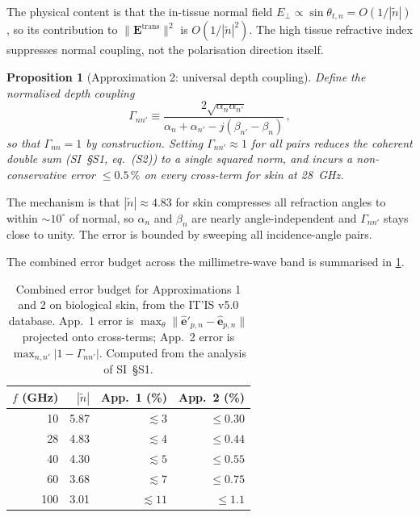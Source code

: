 \documentclass[journal,twocolumn,10pt]{IEEEtran}
\theoremstyle{plain}
\newtheorem{proposition}[theorem]{Proposition}
\theoremstyle{definition}
\theoremstyle{remark}
\newcommand{\EE}{\mathbf{E}}
\newcommand{\ntilde}{\tilde{n}}
\begin{document}
The physical content is that the in-tissue normal field
$E_\perp \propto \sin\theta_{t,n} = O(1/|\ntilde|)$, so its
contribution to $\|\EE^{\mathrm{trans}}\|^2$ is $O(1/|\ntilde|^2)$.
The high tissue refractive index suppresses normal coupling, not
the polarisation direction itself.

\begin{proposition}[Approximation 2: universal depth coupling]
\label{prop:approx2-app}
Define the normalised depth coupling
\begin{equation}\label{eq:Gamma-app}
  \Gamma_{nn'} \equiv
    \frac{2\sqrt{\alpha_n\alpha_{n'}}}
         {\alpha_n + \alpha_{n'} - j(\beta_{n'} - \beta_n)}\,,
\end{equation}
so that $\Gamma_{nn} = 1$ by construction. Setting
$\Gamma_{nn'} \approx 1$ for all pairs reduces the coherent double
sum (SI~\S{}S1, eq.~(S2)) to a single squared norm,
and incurs a non-conservative error $\leq 0.5\,\%$ on every
cross-term for skin at 28~GHz.
\end{proposition}

The mechanism is that $|\ntilde| \approx 4.83$ for skin compresses
all refraction angles to within $\sim\!10^{\circ}$ of normal, so
$\alpha_n$ and $\beta_n$ are nearly angle-independent and
$\Gamma_{nn'}$ stays close to unity. The error is bounded by
sweeping all incidence-angle pairs.

The combined error budget across the millimetre-wave band is
summarised in \cref{tab:approx-acc}.

\begin{table}[!htbp]
\centering
\caption{Combined error budget for Approximations 1 and 2 on
biological skin, from the IT'IS v5.0 database. App.~1 error is
$\max_\theta \|\hat{\bm{e}}'_{p,n} - \hat{\bm{e}}_{p,n}\|$ projected
onto cross-terms; App.~2 error is $\max_{n,n'}|1 - \Gamma_{nn'}|$.
Computed from the analysis of SI~\S{}S1.}
\label{tab:approx-acc}
\begin{tabular}{rrrr}
\toprule
$f$ (GHz) & $|\ntilde|$ & App.~1 (\%) & App.~2 (\%) \\
\midrule
10  & 5.87 & $\lesssim 3$  & $\leq 0.30$ \\
28  & 4.83 & $\lesssim 4$  & $\leq 0.44$ \\
40  & 4.30 & $\lesssim 5$  & $\leq 0.55$ \\
60  & 3.68 & $\lesssim 7$  & $\leq 0.75$ \\
100 & 3.01 & $\lesssim 11$ & $\leq 1.1$  \\
\bottomrule
\end{tabular}
\end{table}
\end{document}

